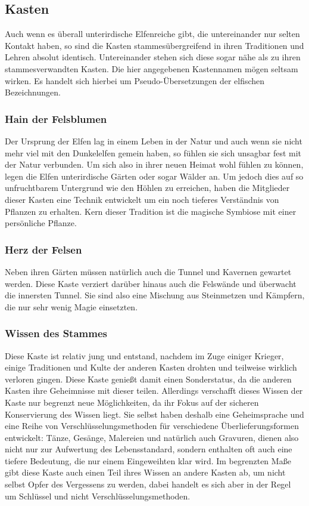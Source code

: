 \documentclass[a4paper,12pt,oneside]{book}
\begin{document}
\subsection{Kasten}
Auch wenn es überall unterirdische Elfenreiche gibt, die untereinander nur selten Kontakt haben, so sind die Kasten stammesübergreifend in ihren Traditionen und Lehren absolut identisch. Untereinander stehen sich diese sogar nähe als zu ihren stammesverwandten Kasten. Die hier angegebenen Kastennamen mögen seltsam wirken. Es handelt sich hierbei um Pseudo-Übersetzungen der elfischen Bezeichnungen.

\subsubsection{Hain der Felsblumen}
Der Ursprung der Elfen lag in einem Leben in der Natur und auch wenn sie nicht mehr viel mit den Dunkelelfen gemein haben, so fühlen sie sich unsagbar fest mit der Natur verbunden. Um sich also in ihrer neuen Heimat wohl fühlen zu können, legen die Elfen unterirdische Gärten oder sogar Wälder an. Um jedoch dies auf so unfruchtbarem Untergrund wie den Höhlen zu erreichen, haben die Mitglieder dieser Kasten eine Technik entwickelt um ein noch tieferes Verständnis von Pflanzen zu erhalten. Kern dieser Tradition ist die magische Symbiose mit einer persönliche Pflanze. 

\subsubsection{Herz der Felsen}
Neben ihren Gärten müssen natürlich auch die Tunnel und Kavernen gewartet werden. Diese Kaste verziert darüber hinaus auch die Felswände und überwacht die innersten Tunnel. Sie sind also eine Mischung aus Steinmetzen und Kämpfern, die nur sehr wenig Magie einsetzten.

\subsubsection{Wissen des Stammes}
Diese Kaste ist relativ jung und entstand, nachdem im Zuge einiger Krieger, einige Traditionen und Kulte der anderen Kasten drohten und teilweise wirklich verloren gingen. Diese Kaste genießt damit einen Sonderstatus, da die anderen Kasten ihre Geheimnisse mit dieser teilen. Allerdings verschafft dieses Wissen der Kaste nur begrenzt neue Möglichkeiten, da ihr Fokus auf der sicheren Konservierung des Wissen liegt. Sie selbst haben deshalb eine Geheimsprache und eine Reihe von Verschlüsselungsmethoden für verschiedene Überlieferungsformen entwickelt: Tänze, Gesänge, Malereien und natürlich auch Gravuren, dienen also nicht nur zur Aufwertung des Lebensstandard, sondern enthalten oft auch eine tiefere Bedeutung, die nur einem Eingeweihten klar wird. Im begrenzten Maße gibt diese Kaste auch einen Teil ihres Wissen an andere Kasten ab, um nicht selbst Opfer des Vergessens zu werden, dabei handelt es sich aber in der Regel um Schlüssel und nicht Verschlüsselungsmethoden. 
\end{document}
